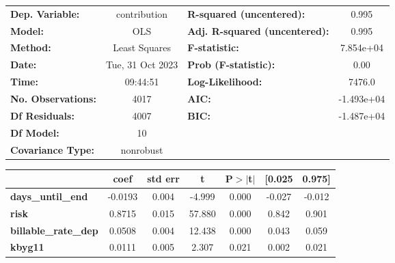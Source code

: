 \begin{center}
\begin{tabular}{lclc}
\toprule
\textbf{Dep. Variable:}                   &   contribution   & \textbf{  R-squared (uncentered):}      &     0.995   \\
\textbf{Model:}                           &       OLS        & \textbf{  Adj. R-squared (uncentered):} &     0.995   \\
\textbf{Method:}                          &  Least Squares   & \textbf{  F-statistic:       }          & 7.854e+04   \\
\textbf{Date:}                            & Tue, 31 Oct 2023 & \textbf{  Prob (F-statistic):}          &     0.00    \\
\textbf{Time:}                            &     09:44:51     & \textbf{  Log-Likelihood:    }          &    7476.0   \\
\textbf{No. Observations:}                &        4017      & \textbf{  AIC:               }          & -1.493e+04  \\
\textbf{Df Residuals:}                    &        4007      & \textbf{  BIC:               }          & -1.487e+04  \\
\textbf{Df Model:}                        &          10      & \textbf{                     }          &             \\
\textbf{Covariance Type:}                 &    nonrobust     & \textbf{                     }          &             \\
\bottomrule
\end{tabular}
\begin{tabular}{lcccccc}
                                          & \textbf{coef} & \textbf{std err} & \textbf{t} & \textbf{P$> |$t$|$} & \textbf{[0.025} & \textbf{0.975]}  \\
\midrule
\textbf{days\_until\_end}                 &      -0.0193  &        0.004     &    -4.999  &         0.000        &       -0.027    &       -0.012     \\
\textbf{risk}                             &       0.8715  &        0.015     &    57.880  &         0.000        &        0.842    &        0.901     \\
\textbf{billable\_rate\_dep}              &       0.0508  &        0.004     &    12.438  &         0.000        &        0.043    &        0.059     \\
\textbf{kbyg11}                           &       0.0111  &        0.005     &     2.307  &         0.021        &        0.002    &        0.021     \\

\end{tabular}
\end{center}
